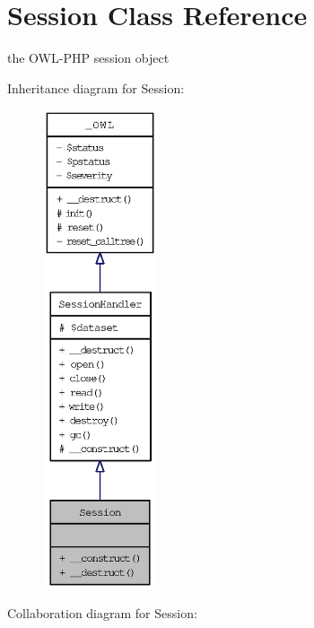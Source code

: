 \hypertarget{classSession}{
\section{Session Class Reference}
\label{classSession}
}
the OWL-PHP session object  


Inheritance diagram for Session:\nopagebreak
\begin{figure}[H]
\begin{center}
\leavevmode
\includegraphics[height=400pt]{classSession__inherit__graph}
\end{center}
\end{figure}
Collaboration diagram for Session:\nopagebreak
